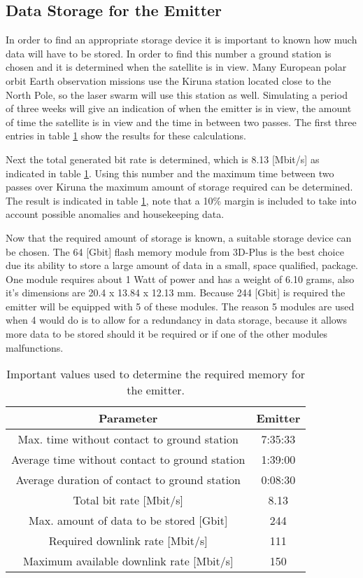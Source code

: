 \subsection{Data Storage for the Emitter}
\label{DSEmitter}

In order to find an appropriate storage device it is important to known how much data will have to be stored. In order to find this number a ground station is chosen and it is determined when the satellite is in view. Many European polar orbit Earth observation missions use the Kiruna station located close to the North Pole, so the laser swarm will use this station as well. Simulating a period of three weeks will give an indication of when the emitter is in view, the amount of time the satellite is in view and the time in between two passes. The first three entries in table \ref{DSEmitterTable} show the results for these calculations.

Next the total generated bit rate is determined, which is 8.13 [Mbit/s] as indicated in table \ref{DSEmitterTable}. Using this number and the maximum time between two passes over Kiruna the maximum amount of storage required can be determined. The result is indicated in table \ref{DSEmitterTable}, note that a 10\% margin is included to take into account possible anomalies and housekeeping data. 

Now that the required amount of storage is known, a suitable storage device can be chosen. The 64 [Gbit] flash memory module from 3D-Plus \cite{DataStorage} is the best choice due its ability to store a large amount of data in a small, space qualified, package. One module requires about 1 Watt of power and has a weight of 6.10 grams, also it's dimensions are 20.4 x 13.84 x 12.13 mm. Because 244 [Gbit] is required the emitter will be equipped with 5 of these modules. The reason 5 modules are used when 4 would do is to allow for a redundancy in data storage, because it allows more data to be stored should it be required or if one of the other modules malfunctions.

\begin{table}
\centering
\begin{tabular}{c|c}
\textbf{Parameter}  & \textbf{Emitter} \\\hline\hline
	Max. time without contact to ground station & 7:35:33 \\
	Average time without contact to ground station & 1:39:00  \\
	Average duration of contact to ground station & 0:08:30 \\
	Total bit rate [Mbit/s] & 8.13 \\
	Max. amount of data to be stored [Gbit] & 244 \\
	Required downlink rate [Mbit/s] & 111 \\
	Maximum available downlink rate [Mbit/s] & 150 \\
\end{tabular}
\caption{Important values used to determine the required memory for the emitter.}
\label{DSEmitterTable}
\end{table}


